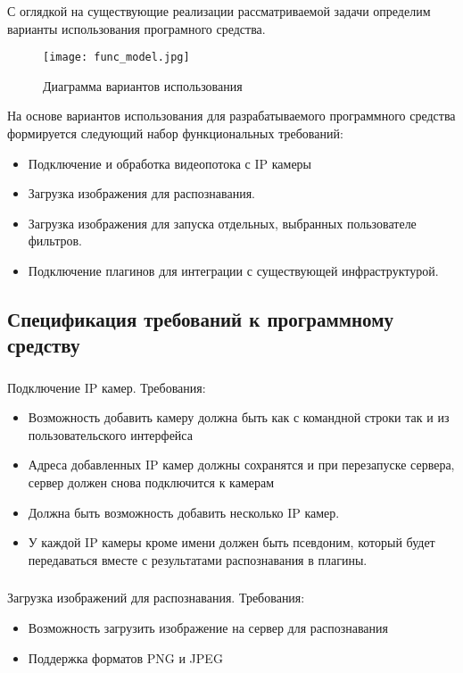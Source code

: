 С оглядкой на существующие реализации рассматриваемой задачи определим варианты использования програмного средства.

\begin{figure}[ht]
\centering
    \texttt{[image: func\_model.jpg]}  
    \caption{Диаграмма вариантов использования}
  \label{fig:funcreq:funcmodel}
\end{figure}

На основе вариантов использования для разрабатываемого программного средства формируется следующий набор функциональных требований:
\begin{itemize}
	\item Подключение и обработка видеопотока с IP камеры
	\item Загрузка изображения для распознавания.
	\item Загрузка изображения для запуска отдельных, выбранных пользователе фильтров.
	\item Подключение плагинов для интеграции с существующей инфраструктурой.
\end{itemize}

\subsection{Спецификация требований к программному средству}
\label{sec:fucreq:specification}

\subsubsection{}
Подключение IP камер. Требования:
\begin{itemize}
	\item Возможность добавить камеру должна быть как с командной строки так и из пользовательского интерфейса
	\item Адреса добавленных IP камер должны сохранятся и при перезапуске сервера, сервер должен снова подключится к камерам
	\item Должна быть возможность добавить несколько IP камер.
	\item У каждой IP камеры кроме имени должен быть псевдоним, который будет передаваться вместе с результатами распознавания в плагины. 
\end{itemize}

\subsubsection{}
Загрузка изображений для распознавания. Требования:
\begin{itemize}
	\item Возможность загрузить изображение на сервер для распознавания
	\item Поддержка форматов PNG и JPEG
\end{itemize}

